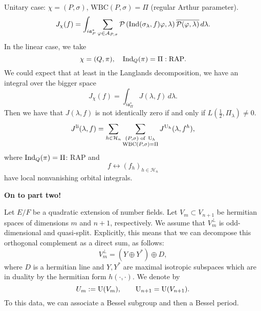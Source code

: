 \documentclass[reqno]{amsart} 
\begin{document}
Unitary case: $\chi = (P, \sigma)$, $\mathrm{WBC} (P, \sigma) = \Pi $ (regular Arthur parameter).
\begin{equation*}
  J_\chi (f) = \int_{i \mathfrak{a}_P^\ast } \sum_{\varphi \in \mathcal{A}_{P, \sigma }}
  \mathcal{P} \left( \operatorname{Ind} (\sigma_\lambda, f) \varphi, \lambda  \right)
  \overline{\mathcal{P} (\varphi, \lambda )} \, d \lambda.
\end{equation*}
In the linear case, we take
\begin{equation*}
\chi = (Q, \pi ), \quad \operatorname{Ind}_Q (\pi) = \Pi : \mathrm{RAP}.
\end{equation*}
We could expect that at least in the Langlands decomposition, we have an integral over the bigger space
\begin{equation*}
J_\chi (f) = \int_{i \mathfrak{a}_{\Pi}^\ast } J (\lambda, f) \, d \lambda.
\end{equation*}
Then we have that $J (\lambda, f)$ is not identically zero if and only if $L (\tfrac{1}{2}, \Pi_\lambda ) \neq 0$.
\begin{equation*}
  J^{\mathrm{li}} (\lambda, f) = \sum_{h \in \mathcal{H}_n } \sum_{
    \substack{
      (P, \sigma) \text{ of } \operatorname{U}_h   \\
       \mathrm{WBC} (P, \sigma) = \Pi 
    }
  }
  J^{\operatorname{U}_h } (\lambda, f^h ),
\end{equation*}
where $\operatorname{Ind}_Q (\pi) = \Pi $: RAP and
\begin{equation*}
  f \leftrightarrow (f_h )_{h \in \mathcal{H}_n }
\end{equation*}
have local nonvanishing orbital integrals.

\textbf{On to part two!}

Let $E/F$ be a quadratic extension of number fields.  Let $V_m \subset V_{n + 1}$ be hermitian spaces of dimensions $m$ and $n + 1$, respectively.  We assume that $V_m^\perp $ is odd-dimensional and quasi-split.  Explicitly, this means that we can decompose this orthogonal complement as a direct sum, as follows:
\begin{equation*}
V_m^\perp = \left( Y \oplus Y^\ast  \right) \oplus D,
\end{equation*}
where $D$ is a hermitian line and $Y, Y^*$ are maximal isotropic subspaces which are in duality by the hermitian form $h (\cdot, \cdot )$.  We denote by
\begin{equation*}
U_m := \operatorname{U} (V_m),  \qquad \operatorname{U}_{n + 1} = \operatorname{U} (V_{n + 1}).
\end{equation*}
To this data, we can associate a Bessel subgroup and then a Bessel period.
\end{document}

